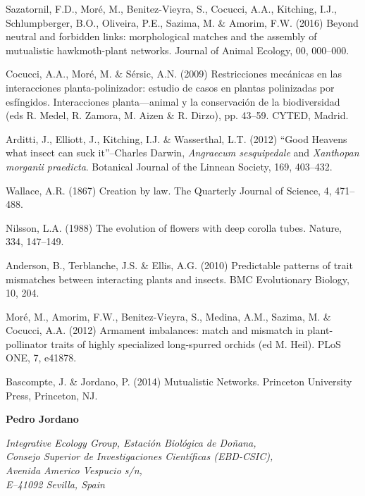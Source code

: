 \documentclass[a4paper,12pt]{article}
\begin{document}
\begin{thebibliography}{10}

Sazatornil, F.D., Moré, M., Benitez-Vieyra, S., Cocucci, A.A., Kitching, I.J., Schlumpberger, B.O., Oliveira, P.E., Sazima, M. \& Amorim, F.W. (2016) Beyond neutral and forbidden links: morphological matches and the assembly of mutualistic hawkmoth-plant networks. Journal of Animal Ecology, 00, 000–000.

Cocucci, A.A., Mor\'e, M. \& S\'ersic, A.N. (2009) Restricciones mec\'anicas en las interacciones planta-polinizador: estudio de casos en plantas polinizadas por esf\'ingidos. Interacciones planta---animal y la conservaci\'on de la biodiversidad (eds R. Medel, R. Zamora, M. Aizen \& R. Dirzo), pp. 43–59. CYTED, Madrid.

Arditti, J., Elliott, J., Kitching, I.J. \& Wasserthal, L.T. (2012) “Good Heavens what insect can suck it”–Charles Darwin, \textit{Angraecum sesquipedale} and \textit{Xanthopan morganii praedicta}. Botanical Journal of the Linnean Society, 169, 403–432.

Wallace, A.R. (1867) Creation by law. The Quarterly Journal of Science, 4, 471–488.

Nilsson, L.A. (1988) The evolution of flowers with deep corolla tubes. Nature, 334, 147–149.

Anderson, B., Terblanche, J.S. \& Ellis, A.G. (2010) Predictable patterns of trait mismatches between interacting plants and insects. BMC Evolutionary Biology, 10, 204.

Moré, M., Amorim, F.W., Benitez-Vieyra, S., Medina, A.M., Sazima, M. \& Cocucci, A.A. (2012) Armament imbalances: match and mismatch in plant-pollinator traits of highly specialized long-spurred orchids (ed M. Heil). PLoS ONE, 7, e41878.

Bascompte, J. \& Jordano, P. (2014) Mutualistic Networks. Princeton University Press, Princeton, NJ.

\end{thebibliography}


\begin{flushright}
  \noindent 
  		\textbf{Pedro Jordano }\\
  		\begin{spacing}{1.0}
		\textit{Integrative Ecology Group, Estaci\'on Biol\'ogica de Do\~nana, \\ Consejo Superior de Investigaciones Cient\'ificas (EBD-CSIC), \\ Avenida Americo Vespucio s\slash n, \\ E--41092 Sevilla, Spain}
		\end{spacing}
\end{flushright}
\newpage
\end{document}
